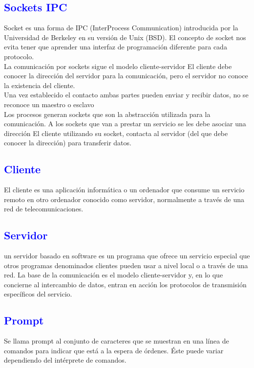 \documentclass[fontsize=12pt]{article}
\begin{document}
\subsection{\textbf{\textcolor{blue}{Sockets IPC}}}
Socket es una forma de IPC (InterProcess Communication) introducida por la Universidad de
Berkeley en su versión de Unix (BSD). El concepto de socket nos evita tener que aprender una
interfaz de programación diferente para cada protocolo.\\
La comunicación por sockets sigue el modelo cliente-servidor
El cliente debe conocer la dirección del servidor para la comunicación, pero el servidor no conoce la existencia del cliente.\\
Una vez establecido el contacto ambas partes pueden enviar y recibir datos, no se reconoce un maestro o esclavo\\
Los procesos generan sockets que son la abstracción utilizada para la comunicación.
A los sockets que van a prestar un servicio se les debe asociar una dirección El cliente utilizando su socket, contacta al servidor (del
que debe conocer la dirección) para transferir datos.
\subsection{\textbf{\textcolor{blue}{Cliente}}}
El cliente es una aplicación informática o un ordenador que consume un
servicio remoto en otro ordenador conocido como servidor, normalmente a través
de una red de telecomunicaciones.
\subsection{\textbf{\textcolor{blue}{Servidor}}}
un servidor basado en software es un programa que ofrece un servicio especial que otros programas denominados clientes pueden usar a nivel local o a través de una red.
La base de la comunicación es el modelo cliente-servidor y, en lo que concierne al intercambio de datos, entran en acción los protocolos de transmisión específicos del servicio.
\subsection{\textbf{\textcolor{blue}{Prompt}}}
Se llama prompt al conjunto de caracteres que se muestran en una línea de
comandos para indicar que está a la espera de órdenes. Éste puede variar
dependiendo del intérprete de comandos.
\clearpage
\end{document}
